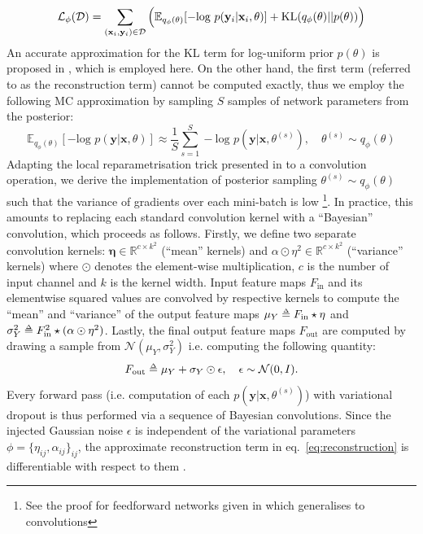  \begin{equation} \label{eq:loss_elbo_sr}
\mathcal{L}_{\phi} (\mathcal{D}) =  \sum_{(\mathbf{x}_i,\mathbf{y}_i)\in\mathcal{D}} \Big{(}  \mathbb{E}_{q_{\phi}(\theta)}[- \text{log }p(\mathbf{y}_i|\mathbf{x}_i,\theta)]   +  \text{KL} (q_{\phi}(\theta)||p(\theta))\Big{)}
 \end{equation}
An accurate approximation for the KL term for log-uniform prior $p(\theta)$ is proposed in \cite{molchanov2017variational}, which is employed here. On the other hand, the first term (referred to as the reconstruction term) cannot be computed exactly, thus we employ the following MC approximation by sampling $S$ samples of network parameters from the posterior:
\begin{equation}\label{eq:reconstruction}
\mathbb{E}_{q_{\phi}(\theta)}[- \text{log }p(\mathbf{y}|\mathbf{x},\theta)] \approx \frac{1}{S}\sum_{s=1}^{S} - \text{log }p(\mathbf{y}|\mathbf{x},\theta^{(s)}), \quad \theta^{(s)} \sim q_{\phi}(\theta)
\end{equation}
Adapting the local reparametrisation trick presented in \cite{kingma2015variational} to a convolution operation, we derive the implementation of posterior sampling $\theta^{(s)} \sim q_{\phi}(\theta)$ such that the variance of gradients over each mini-batch is low \footnote{See the proof for feedforward networks given in  \cite{kingma2015variational} which generalises to convolutions}. In practice, this amounts to replacing each standard convolution kernel with a ``Bayesian'' convolution, which proceeds as follows. Firstly, we define two separate convolution kernels: $\mathbf{\eta} \in \mathbb{R}^{c\times k^2}$ (``mean'' kernels) and $\alpha \odot \eta^{2} \in \mathbb{R}^{c\times k^2}$ (``variance'' kernels) where $ \odot $ denotes the element-wise multiplication, $c$ is the number of input channel and $k$ is the kernel width. Input feature maps $F_{\text{in}}$ and its elementwise squared values are convolved by respective kernels to compute the ``mean'' and ``variance'' of the output feature maps $\mu_{Y}\delequal F_{\text{in}} \star \mathbf{\eta}$ and $\sigma^{2}_{Y} \delequal F_{\text{in}}^2\star (\alpha \odot \eta^{2})$. Lastly, the final output feature maps $F_{\text{out}}$ are computed by drawing a sample from $\mathcal{N}(\mu_{Y}, \sigma^{2}_{Y})$ i.e. computing the following quantity: 
\begin{equation}\label{eq:noise_injection}
F_{\text{out}} \delequal \mu_{Y} +  \sigma_{Y} \odot \mathbf{\epsilon}, \quad \mathbf{\epsilon} \sim \mathcal{N}(0,I).
\end{equation}
Every forward pass (i.e. computation of each $p(\mathbf{y}|\mathbf{x},\theta^{(s)})$) with variational dropout is thus performed via a sequence of Bayesian convolutions.  Since the injected Gaussian noise $\epsilon$ is independent of the variational parameters $\phi=\{\eta_{ij}, \alpha_{ij}\}_{ij}$, the approximate reconstruction term in eq.~\ref{eq:reconstruction} is differentiable with respect to them \cite{kingma2013auto}.  

